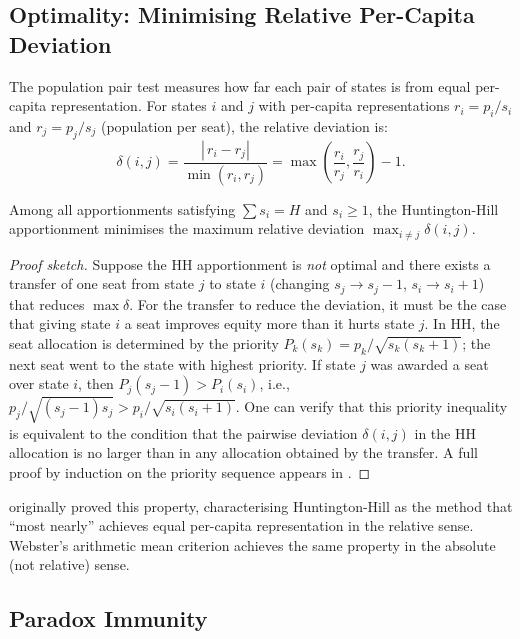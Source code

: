 \label{sec:properties}

\subsection{Optimality: Minimising Relative Per-Capita Deviation}

The population pair test measures how far each pair of states is from
equal per-capita representation.
For states $i$ and $j$ with per-capita representations $r_i = p_i/s_i$
and $r_j = p_j/s_j$ (population per seat), the relative deviation is:
\[
  \delta(i,j) = \frac{|\,r_i - r_j|}{\min(r_i, r_j)}
              = \max\!\left(\frac{r_i}{r_j}, \frac{r_j}{r_i}\right) - 1.
\]

\begin{theorem}
  \label{thm:hh-optimal}
  Among all apportionments satisfying $\sum s_i = H$ and $s_i \geq 1$,
  the Huntington-Hill apportionment minimises the maximum relative
  deviation $\max_{i \neq j} \delta(i, j)$.
\end{theorem}

\begin{proof}[Proof sketch]
  Suppose the HH apportionment is \emph{not} optimal and there exists
  a transfer of one seat from state $j$ to state $i$
  (changing $s_j \to s_j-1$, $s_i \to s_i+1$) that reduces
  $\max \delta$.
  For the transfer to reduce the deviation, it must be the case that
  giving state $i$ a seat improves equity more than it hurts
  state $j$.
  In HH, the seat allocation is determined by the priority
  $P_k(s_k) = p_k/\sqrt{s_k(s_k+1)}$; the next seat went to the
  state with highest priority.
  If state $j$ was awarded a seat over state $i$,
  then $P_j(s_j-1) > P_i(s_i)$, i.e.,
  $p_j/\sqrt{(s_j-1)s_j} > p_i/\sqrt{s_i(s_i+1)}$.
  One can verify that this priority inequality is equivalent to
  the condition that the pairwise deviation $\delta(i,j)$ in the
  HH allocation is no larger than in any allocation obtained
  by the transfer.
  A full proof by induction on the priority sequence appears in
  \citet[ch.~4]{balinski1982fair}.
\end{proof}

\citet{huntington1928method} originally proved this property, characterising
Huntington-Hill as the method that ``most nearly'' achieves equal
per-capita representation in the relative sense.
Webster's arithmetic mean criterion achieves the same property in
the absolute (not relative) sense.

\subsection{Paradox Immunity}

